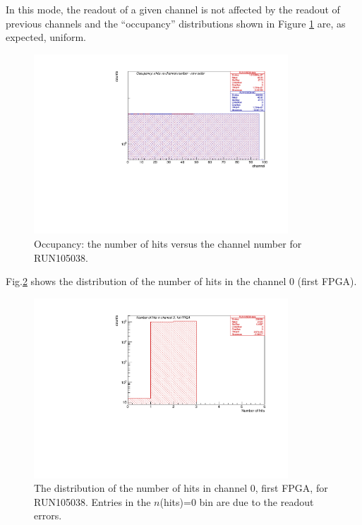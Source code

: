 In this mode, the readout of a given channel is not affected by the readout of previous
channels and the ``occupancy'' distributions shown in Figure \ref{fig:5} are, as expected, uniform.
\begin{figure}[!h]
\centering
\includegraphics[width =0.85\textwidth]{figures/pdf/figure_00002_nhitsvschannel_roc_simulation_2.pdf}
\caption{Occupancy: the number of hits versus the channel number for RUN105038.}
\label{fig:5}
\end{figure}


Fig.\ref{fig:67} shows the distribution of the number of hits in the channel 0 (first FPGA).
\begin{figure}[!h]
\centering
\includegraphics[width =0.85\textwidth]{figures/pdf/figure_00067_nhits_ch00_run105038.pdf}
\caption{
  The distribution of the number of hits in channel 0, first FPGA, for RUN105038.
  Entries in the $n$(hits)=0 bin are due to the readout errors.
}
\label{fig:67}
\end{figure}


